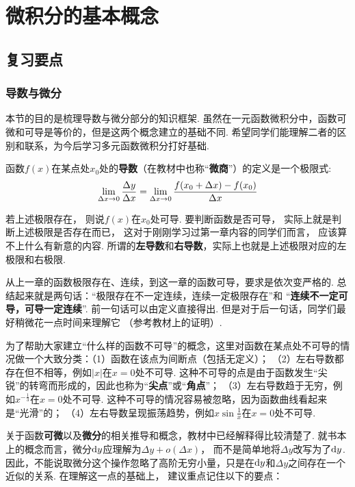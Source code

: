 \clearpage
\section{微积分的基本概念}

\subsection{复习要点}
\subsubsection{导数与微分}
本节的目的是梳理导数与微分部分的知识框架. 虽然在一元函数微积分中，函数可微和可导是等价的，但是这两个概念建立的基础不同.
希望同学们能理解二者的区别和联系，为今后学习多元函数微积分打好基础. \par
函数$f(x)$在某点处$x_{0}$处的\textbf{导数}（在教材中也称“\textbf{微商}”）的定义是一个极限式:
$$
\setlength\abovedisplayskip{10pt}
\setlength\belowdisplayskip{10pt}
\lim\limits_{\Delta x \to 0}\frac{\Delta y}{\Delta x} =
\lim\limits_{\Delta x \to 0}\frac{f(x_{0}+\Delta x)-f(x_{0})}{\Delta x}
$$

若上述极限存在，
则说$f(x)$在$x_{0}$处可导.
要判断函数是否可导，
实际上就是判断上述极限是否存在而已，
这对于刚刚学习过第一章内容的同学们而言，
应该算不上什么有新意的内容.
所谓的\textbf{左导数}和\textbf{右导数}，实际上也就是上述极限对应的左极限和右极限. \par
从上一章的函数极限存在、连续，到这一章的函数可导，要求是依次变严格的. 总结起来就是两句话：“极限存在不一定连续，连续一定极限存在”和
“\textbf{连续不一定可导，可导一定连续}”.
前一句话可以由定义直接得出.
但是对于后一句话，同学们最好稍微花一点时间来理解它
（参考教材上的证明）.\par
为了帮助大家建立“什么样的函数不可导”的概念，这里对函数在某点处不可导的情况做一个大致分类：（1）函数在该点为间断点（包括无定义）；
（2）左右导数都存在但不相等，例如$|x|$在$x=0$处不可导. 这种不可导的点是由于函数发生“尖锐”的转弯而形成的，因此也称为“\textbf{尖点}”或“\textbf{角点}”；
（3）左右导数趋于无穷，例如$x^{-\frac{1}{3}}$在$x=0$处不可导. 这种不可导的情况容易被忽略，因为函数曲线看起来是“光滑”的；
（4）左右导数呈现振荡趋势，例如$x\sin \frac{1}{x}$在$x=0$处不可导.\vspace{0.5em}

关于函数\textbf{可微}以及\textbf{微分}的相关推导和概念，教材中已经解释得比较清楚了.
就书本上的概念而言，微分$\mathrm{d} y$应理解为$\Delta y +o(\Delta x)$，
而不是简单地将$\Delta y$改写为了$\mathrm{d} y$.
因此，不能说取微分这个操作忽略了高阶无穷小量，只是在$\mathrm{d} y$和$\Delta y$之间存在一个近似的关系.
在理解这一点的基础上，
建议重点记住以下的要点：\vspace{0.5em}

